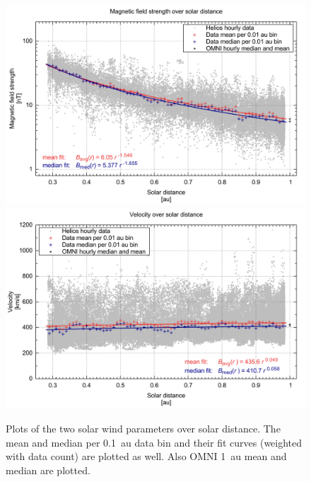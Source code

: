 \begin{figure}[p]
	\centering
	\includegraphics[width=1.0\textwidth+4mm]{images/gnuplots/radial_fit_B_thesis_pdfcairo_plot.pdf}
	\includegraphics[width=1.0\textwidth+4mm]{images/gnuplots/radial_fit_v_thesis_pdfcairo_plot.pdf}
	\caption{Plots of the two solar wind parameters over solar distance. The mean and median per 0.1~au data bin and their fit curves (weighted with data count) are plotted as well. Also OMNI 1~au mean and median are plotted.}
	\label{fig:radial_fit_Bv_thesis_pdfcairo_plot}
\end{figure}

